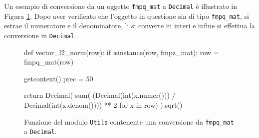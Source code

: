 Un esempio di conversione da un oggetto \texttt{fmpq\_mat} a \texttt{Decimal} è illustrato 
in Figura \ref{fig:conversione}. Dopo aver verificato che l'oggetto in questione sia di tipo  
\texttt{fmpq\_mat}, 
si estrae il numeratore e il denominatore, li si converte in interi e infine si effettua 
la conversione in \texttt{Decimal}. 

\begin{figure}[H]
    \begin{python}
        def vector_l2_norm(row):
            if isinstance(row, fmpz_mat):
                row = fmpq_mat(row)

            getcontext().prec = 50
            
            return Decimal(
                sum(
                    (Decimal(int(x.numer())) / 
                    Decimal(int(x.denom()))) ** 2 
                    for x in row)
                ).sqrt()
    \end{python}
    \caption[Conversione da \texttt{fmpq\_mat} a \texttt{Decimal}.]
    {Funzione del modulo \texttt{Utils} contenente una
    conversione da \texttt{fmpq\_mat} a \texttt{Decimal}.}
    \label{fig:conversione}
\end{figure}
